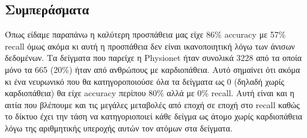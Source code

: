 \documentclass[../main.tex]{subfiles}
\begin{document}
\subsection{Συμπεράσματα}

Όπως είδαμε παραπάνω η καλύτερη προσπάθεια μας είχε 86\% accuracy με 57\% recall
όμως ακόμα κι αυτή η προσπάθεια δεν είναι ικανοποιητική λόγω των άνισων
δεδομένων. Τα δείγματα που παρείχε η Physionet \cite{physionet} ήταν συνολικά
3228 από τα οποία μόνο τα 665 (20\%) ήταν από ανθρώπους με καρδιοπάθεια.
Αυτό σημαίνει ότι ακόμα κι ένα νευρωνικό που θα κατηγοροποιούσε όλα τα δείγματα
ως 0 (δηλαδή χωρίς καρδιοπάθεια) θα είχε accuracy περίπου 80\% αλλά με 0\%
recall. Αυτή είναι και η αιτία που βλέπουμε και τις μεγάλες μεταβολές από εποχή
σε εποχή στο recall καθώς το δίκτυο έχει την τάση να κατηγοριοποιεί κάθε δείγμα
ως άτομο χωρίς καρδιοπάθεια λόγω της αριθμητικής υπεροχής αυτών τον ατόμων στα
δείγματα.
\end{document}
